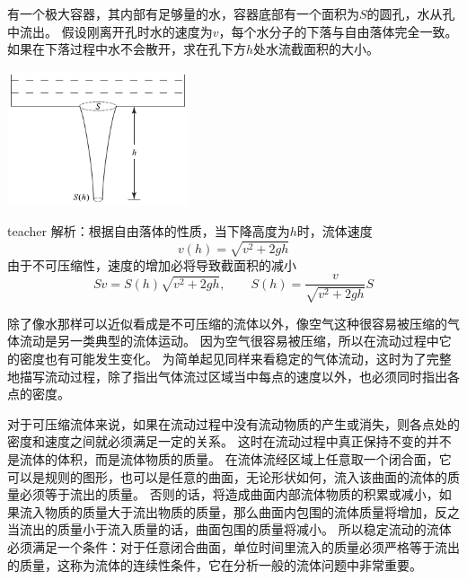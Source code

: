 \begin{example}
有一个极大容器，其内部有足够量的水，容器底部有一个面积为$S$的圆孔，水从孔中流出。
假设刚离开孔时水的速度为$v$，每个水分子的下落与自由落体完全一致。
如果在下落过程中水不会散开，求在孔下方$h$处水流截面积的大小。
\begin{flushright}
\includegraphics[width = 0.4\textwidth]{images/motion-50.pdf} 
\end{flushright}
\begin{taggedblock}{teacher}
\noindent
解析：根据自由落体的性质，当下降高度为$h$时，流体速度
\[v(h)=\sqrt{v^2+2gh}\]
由于不可压缩性，速度的增加必将导致截面积的减小
\[Sv = S(h)\sqrt{v^2+2gh} ,\qquad S(h) = \frac{v}{\sqrt{v^2+2gh}} S\]
\end{taggedblock}
\end{example}

除了像水那样可以近似看成是不可压缩的流体以外，像空气这种很容易被压缩的气体流动是另一类典型的流体运动。
因为空气很容易被压缩，所以在流动过程中它的密度也有可能发生变化。
为简单起见同样来看稳定的气体流动，这时为了完整地描写流动过程，除了指出气体流过区域当中每点的速度以外，也必须同时指出各点的密度。

对于可压缩流体来说，如果在流动过程中没有流动物质的产生或消失，则各点处的密度和速度之间就必须满足一定的关系。
这时在流动过程中真正保持不变的并不是流体的体积，而是流体物质的质量。
在流体流经区域上任意取一个闭合面，它可以是规则的图形，也可以是任意的曲面，无论形状如何，流入该曲面的流体的质量必须等于流出的质量。
否则的话，将造成曲面内部流体物质的积累或减小，如果流入物质的质量大于流出物质的质量，那么曲面内包围的流体质量将增加，反之当流出的质量小于流入质量的话，曲面包围的质量将减小。
所以稳定流动的流体必须满足一个条件：对于任意闭合曲面，单位时间里流入的质量必须严格等于流出的质量，这称为流体的{\heiti 连续性条件}，它在分析一般的流体问题中非常重要。

